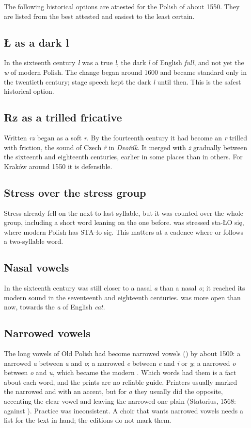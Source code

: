 \documentclass[guide]{pol-ren}
\begin{document}
The following historical options are attested for the Polish of about 1550.
They are listed from the best attested and easiest to the least certain.

\subsection{Ł as a dark l} In the sixteenth century \textit{ł} was a true
\textit{l}, the dark \textit{l} of English \textit{full}, and not yet the
\textit{w} of modern Polish. The change began around 1600 and became standard
only in the twentieth century; stage speech kept the dark \textit{l} until
then. This is the safest historical option.

\subsection{Rz as a trilled fricative} Written \textit{rz} began as a soft
\textit{r}. By the fourteenth century it had become an \textit{r} trilled
with friction, the sound of Czech \textit{ř} in \textit{Dvořák}. It merged
with \textit{ż} gradually between the sixteenth and eighteenth centuries,
earlier in some places than in others. For Kraków around 1550 it is
defensible.

\subsection{Stress over the stress group} Stress already fell on the
next-to-last syllable, but it was counted over the whole group, including a
short word leaning on the one before.  was stressed sta-ŁO się,
where modern Polish has STA-ło się. This matters at a cadence where
 or  follows a two-syllable word.

\subsection{Nasal vowels} In the sixteenth century  was still closer to
a nasal \textit{a} than a nasal \textit{o}; it reached its modern sound in the
seventeenth and eighteenth centuries.  was more open than now, towards
the \textit{a} of English \textit{cat}.

\subsection{Narrowed vowels} The long vowels of Old Polish had become
narrowed vowels () by about 1500: a narrowed
\textit{a} between \textit{a} and \textit{o}; a narrowed \textit{e} between
\textit{e} and \textit{i} or \textit{y}; a narrowed \textit{o} between
\textit{o} and \textit{u}, which became the modern . Which words had
them is a fact about each word, and the prints are no reliable guide.
Printers usually marked the narrowed  and  with an accent, but for
\textit{a} they usually did the opposite, accenting the clear vowel and
leaving the narrowed one plain (Statorius, 1568:  against
). Practice was inconsistent. A choir that wants narrowed vowels
needs a list for the text in hand; the editions do not mark them.
\end{document}
